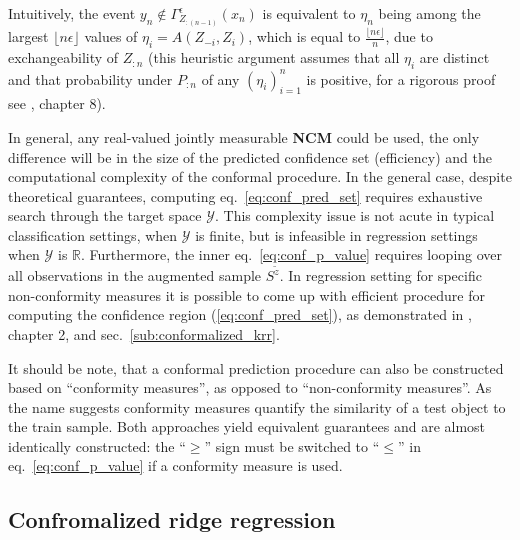 \documentclass{ITaSconf}
\newcommand{\Ycal}{\mathcal{Y}}
\newcommand{\Real}{\mathbb{R}}
\begin{document}
Intuitively, the event $y_n \notin \Gamma^\epsilon_{Z_{:(n-1)}}(x_n)$ is equivalent
to $\eta_n$ being among the largest $\lfloor n\epsilon\rfloor$ values of $\eta_i = A(Z_{-i}, Z_i)$,
which is equal to $\frac{\lfloor n\epsilon\rfloor}{n}$, due to exchangeability of
$Z_{:n}$ (this heuristic argument assumes that all $\eta_i$ are distinct and that
probability under $P_{:n}$ of any $(\eta_i)_{i=1}^n$ is positive, for a rigorous
proof see \cite{vovk2005}, chapter 8).

In general, any real-valued jointly measurable \textbf{NCM} could be used, the only
difference will be in the size of the predicted confidence set (efficiency) and the
computational complexity of the conformal procedure. In the general case, despite
theoretical guarantees, computing eq.~\ref{eq:conf_pred_set} requires exhaustive
search through the target space $\Ycal$. This complexity issue is not acute in typical
classification settings, when $\Ycal$ is finite, but is infeasible in regression
settings when $\Ycal$ is $\Real$. Furthermore, the inner eq.~\ref{eq:conf_p_value}
requires looping over all observations in the augmented sample $S^{\tilde{z}}$.
In regression setting for specific non-conformity measures it is possible to come
up with efficient procedure for computing the confidence region (\ref{eq:conf_pred_set}),
as demonstrated in \cite{vovk2005}, chapter 2, and sec.~\ref{sub:conformalized_krr}.

It should be note, that a conformal prediction procedure can also be constructed
based on ``conformity measures'', as opposed to ``non-conformity measures''. As
the name suggests conformity measures quantify the similarity of a test object to
the train sample. Both approaches yield equivalent guarantees and are almost identically
constructed: the ``$\geq$'' sign must be switched to ``$\leq$'' in eq.~\ref{eq:conf_p_value}
if a conformity measure is used.


\subsection{Confromalized ridge regression} %
\label{sub:confromalized_ridge_regression}
\end{document}
